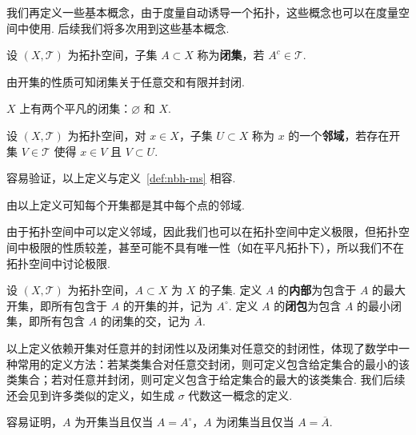 \documentclass[../main.tex]{subfiles}
\begin{document}
我们再定义一些基本概念，由于度量自动诱导一个拓扑，这些概念也可以在度量空间中使用. 后续我们将多次用到这些基本概念. 

\begin{definition}[拓扑空间上闭集的定义]
    设 $(X, \mathcal{T})$ 为拓扑空间，子集 $A \subset X$ 称为\textbf{闭集}，若 $A^c \in \mathcal{T}$. 
\end{definition}

\begin{remark}
    由开集的性质可知闭集关于任意交和有限并封闭. 

    $X$ 上有两个平凡的闭集：$\varnothing$ 和 $X$. 
\end{remark}

\begin{definition}[拓扑空间上邻域的定义]
    设 $(X, \mathcal{T})$ 为拓扑空间，对 $x \in X$，子集 $U \subset X$ 称为 $x$ 的一个\textbf{邻域}，若存在开集 $V \in \mathcal{T}$ 使得 $x \in V$ 且 $V \subset U$. 
\end{definition}

\begin{remark}
    容易验证，以上定义与定义~\ref{def:nbh-ms} 相容. 

    由以上定义可知每个开集都是其中每个点的邻域. 

    由于拓扑空间中可以定义邻域，因此我们也可以在拓扑空间中定义极限，但拓扑空间中极限的性质较差，甚至可能不具有唯一性（如在平凡拓扑下），所以我们不在拓扑空间中讨论极限. 
\end{remark}

\begin{definition}[集合的内部与闭包的定义] \label{def:interior-closure}
    设 $(X, \mathcal{T})$ 为拓扑空间，$A \subset X$ 为 $X$ 的子集. 定义 $A$ 的\textbf{内部}为包含于 $A$ 的最大开集，即所有包含于 $A$ 的开集的并，记为 $A^\circ$. 定义 $A$ 的\textbf{闭包}为包含 $A$ 的最小闭集，即所有包含 $A$ 的闭集的交，记为 $\overline{A}$. 
\end{definition}

\begin{remark}
    以上定义依赖开集对任意并的封闭性以及闭集对任意交的封闭性，体现了数学中一种常用的定义方法：若某类集合对任意交封闭，则可定义包含给定集合的最小的该类集合；若对任意并封闭，则可定义包含于给定集合的最大的该类集合. 我们后续还会见到许多类似的定义，如生成 $\sigma$ 代数这一概念的定义. 

    容易证明，$A$ 为开集当且仅当 $A = A^\circ$，$A$ 为闭集当且仅当 $A = \overline{A}$. 
\end{remark}
\end{document}
